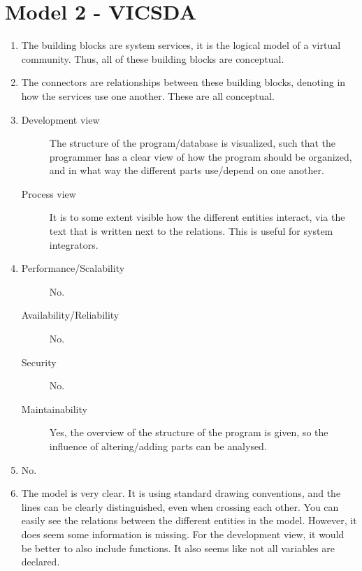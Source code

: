 \section{Model 2 - VICSDA}
\begin{enumerate}
	\item The building blocks are system services, it is the logical model of a virtual community.
	Thus, all of these building blocks are conceptual.
	
	\item The connectors are relationships between these building blocks, denoting in how the services use one another. These are all conceptual.
	
	\item
	\begin{description}
		\item[Development view] The structure of the program/database is visualized, such that the programmer has a clear view of how the program should be organized, and in what way the different parts use/depend on one another.
		\item[Process view] It is to some extent visible how the different entities interact, via the text that is written next to the relations. This is useful for system integrators.
	\end{description}
	
	\item
	\begin{description}
		\item[Performance/Scalability] No.
		\item[Availability/Reliability] No.
		\item[Security] No.
		\item[Maintainability] Yes, the overview of the structure of the program is given, so the influence of altering/adding parts can be analysed.
	\end{description}
	
	\item No.
	
	\item The model is very clear. It is using standard drawing conventions, and the lines can be clearly distinguished, even when crossing each other.
	You can easily see the relations between the different entities in the model.
	However, it does seem some information is missing. For the development view, it would be better to also include functions. It also seems like not all variables are declared.
\end{enumerate}
